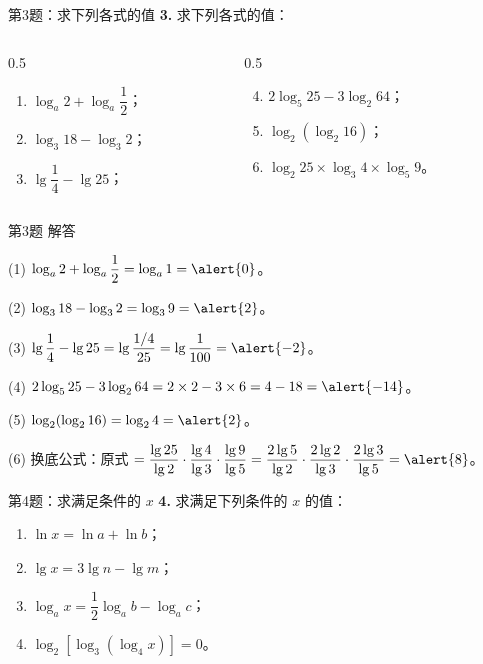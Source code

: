 \documentclass[10pt,aspectratio=169,serif]{beamer}
\begin{document}
\begin{frame}[t]{第3题：求下列各式的值}
\textbf{3.} 求下列各式的值：

\vspace{0.3em}
\begin{columns}[t]
\begin{column}{0.5\textwidth}
\begin{enumerate}
  \item $\log_a 2 + \log_a\dfrac{1}{2}$；
  \item $\log_3 18 - \log_3 2$；
  \item $\lg\dfrac{1}{4} - \lg 25$；
\end{enumerate}
\end{column}
\begin{column}{0.5\textwidth}
\begin{enumerate}\setcounter{enumi}{3}
  \item $2\log_5 25 - 3\log_2 64$；
  \item $\log_2(\log_2 16)$；
  \item $\log_2 25 \times \log_3 4 \times \log_5 9$。
\end{enumerate}
\end{column}
\end{columns}
\end{frame}

\begin{frame}[t]{第3题 解答}
\begin{tcolorbox}[colback=orange!10,colframe=orange,title=\textbf{解}]
(1) $\log_a 2 + \log_a\dfrac{1}{2} = \log_a 1 = \alert{0}$。

(2) $\log_3 18 - \log_3 2 = \log_3 9 = \alert{2}$。

(3) $\lg\dfrac{1}{4} - \lg 25 = \lg\dfrac{1/4}{25} = \lg\dfrac{1}{100} = \alert{-2}$。

(4) $2\log_5 25 - 3\log_2 64 = 2\times 2 - 3\times 6 = 4 - 18 = \alert{-14}$。

(5) $\log_2(\log_2 16) = \log_2 4 = \alert{2}$。

(6) 换底公式：原式 $= \dfrac{\lg 25}{\lg 2}\cdot\dfrac{\lg 4}{\lg 3}\cdot\dfrac{\lg 9}{\lg 5} = \dfrac{2\lg 5}{\lg 2}\cdot\dfrac{2\lg 2}{\lg 3}\cdot\dfrac{2\lg 3}{\lg 5} = \alert{8}$。
\end{tcolorbox}
\end{frame}

\begin{frame}[t]{第4题：求满足条件的 $x$}
\textbf{4.} 求满足下列条件的 $x$ 的值：

\vspace{0.5em}
\begin{enumerate}
  \item $\ln x = \ln a + \ln b$；
  \item $\lg x = 3\lg n - \lg m$；
  \item $\log_a x = \dfrac{1}{2}\log_a b - \log_a c$；
  \item $\log_2[\log_3(\log_4 x)] = 0$。
\end{enumerate}
\end{frame}
\end{document}
